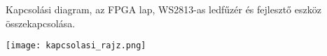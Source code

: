 ﻿Kapcsolási diagram, az FPGA lap, WS2813-as ledfűzér és fejlesztő eszköz összekapcsolása.

\texttt{[image: kapcsolasi\_rajz.png]}